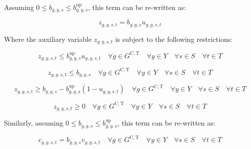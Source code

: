 \documentclass{article}
\newcommand{\sGeneratorsCandidateThermal}{G^{\mathrm{C,T}}}
\newcommand{\sYears}{Y}
\newcommand{\sScenarios}{S}
\newcommand{\sIntervals}{T}
\newcommand{\iGenerator}{g}
\newcommand{\iYear}{y}
\newcommand{\iScenario}{s}
\newcommand{\iInterval}{t}
\newcommand{\vStartupIndicator}[1][\iGenerator,\iYear,\iScenario,\iInterval]{v_{#1}}
\newcommand{\vOnIndicator}[1][\iGenerator,\iYear,\iScenario,\iInterval]{u_{#1}}
\newcommand{\vInstalledCapacityTotalScenario}[1][\iGenerator,\iYear,\iScenario]{b_{#1}}
\newcommand{\vInstalledCapacityOnStateAux}[1][\iGenerator,\iYear,\iScenario,\iInterval]{z_{#1}}
\newcommand{\vInstalledCapacityStartupStateAux}[1][\iGenerator,\iYear,\iScenario,\iInterval]{c_{#1}}
\begin{document}
Assuming $0 \leq \vInstalledCapacityTotalScenario \leq \vInstalledCapacityTotalScenario^{\mathrm{up}}$, this term can be re-written as:

\begin{equation}
	\vInstalledCapacityOnStateAux = \vInstalledCapacityTotalScenario \vOnIndicator
\end{equation}

Where the auxiliary variable $\vInstalledCapacityOnStateAux$ is subject to the following restrictions:

\begin{equation}
	\vInstalledCapacityOnStateAux \leq \vInstalledCapacityTotalScenario^{\mathrm{up}} \vOnIndicator \quad \forall \iGenerator \in \sGeneratorsCandidateThermal \quad \forall \iYear \in \sYears \quad \forall \iScenario \in \sScenarios \quad \forall \iInterval \in \sIntervals
	\label{eqn: on state aux variable block start}
\end{equation}

\begin{equation}
	\vInstalledCapacityOnStateAux \leq \vInstalledCapacityTotalScenario \quad \forall \iGenerator \in \sGeneratorsCandidateThermal \quad \forall \iYear \in \sYears \quad \forall \iScenario \in \sScenarios \quad \forall \iInterval \in \sIntervals
\end{equation}

\begin{equation}
	\vInstalledCapacityOnStateAux \geq \vInstalledCapacityTotalScenario - \vInstalledCapacityTotalScenario^{\mathrm{up}} \left(1 - \vOnIndicator \right) \quad \forall \iGenerator \in \sGeneratorsCandidateThermal \quad \forall \iYear \in \sYears \quad \forall \iScenario \in \sScenarios \quad \forall \iInterval \in \sIntervals
\end{equation}

\begin{equation}
	\vInstalledCapacityOnStateAux \geq 0 \quad \forall \iGenerator \in \sGeneratorsCandidateThermal \quad \forall \iYear \in \sYears \quad \forall \iScenario \in \sScenarios \quad \forall \iInterval \in \sIntervals
	\label{eqn: on state aux variable block end}
\end{equation}

Similarly, assuming $0 \leq \vInstalledCapacityTotalScenario \leq \vInstalledCapacityTotalScenario^{\mathrm{up}}$, this term can be re-written as:

\begin{equation}
\vInstalledCapacityStartupStateAux = \vInstalledCapacityTotalScenario \vStartupIndicator \quad \forall \iGenerator \in \sGeneratorsCandidateThermal \quad \forall \iYear \in \sYears \quad \forall \iScenario \in \sScenarios \quad \forall \iInterval \in \sIntervals
\end{equation}
\end{document}
